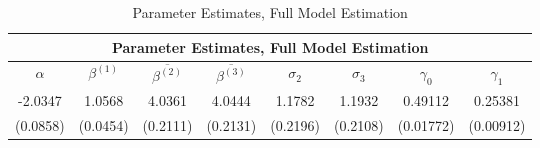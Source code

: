 
\begin{table}
\centering
\begin{tabular}{ |c|c|c|c|c|c|c|c| }
 \hline
 \multicolumn{8}{|c|}{Parameter Estimates, Full Model Estimation} \\
 \hline
 $\alpha$ & $\beta^{(1)}$ & $\overline{\beta^{(2)}}$ & $\overline{\beta^{(3)}}$ & $\sigma_2$ & $\sigma_3$ & $\gamma_0$ & $\gamma_1$ \\
 \hline
 -2.0347 & 1.0568 & 4.0361 & 4.0444 & 1.1782 & 1.1932 & 0.49112 & 0.25381 \\
(0.0858) & (0.0454) & (0.2111) & (0.2131) & (0.2196) & (0.2108) & (0.01772) & (0.00912)\\
 \hline
\end{tabular}
\label{table5_2}
\caption{Parameter Estimates, Full Model Estimation}
\end{table}
